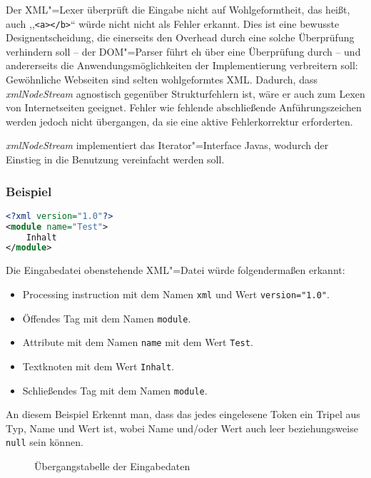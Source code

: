 \documentclass[10pt,a4paper,ngerman,titlepage,tocindentauto]{scrartcl}
\begin{document}
			Der XML"=Lexer überprüft die Eingabe nicht auf Wohlgeformtheit, das heißt, auch
			,,\verb|<a></b>|`` würde nicht nicht als Fehler erkannt. Dies ist eine bewusste Designentscheidung,
			die einerseits den Overhead durch eine solche Überprüfung verhindern soll -- der DOM"=Parser
			führt eh über eine Überprüfung durch -- und andererseits die Anwendungsmöglichkeiten der Implementierung
			verbreitern soll: Gewöhnliche Webseiten sind selten wohlgeformtes XML. Dadurch,
			dass {\em xmlNodeStream} agnostisch gegenüber Strukturfehlern ist, wäre er auch zum
			Lexen von Internetseiten geeignet. Fehler wie fehlende abschließende Anführungszeichen werden
			jedoch nicht übergangen, da sie eine aktive Fehlerkorrektur erforderten.
			
			{\em xmlNodeStream} implementiert das Iterator"=Interface Javas, wodurch der Einstieg in die
			Benutzung vereinfacht werden soll.
			
			\subsubsection*{Beispiel}
				\begin{lstlisting}[frame=single,language=XML,caption=Beispiel.xml]
<?xml version="1.0"?>
<module name="Test">
	Inhalt
</module>
				\end{lstlisting}
				Die Eingabedatei obenstehende XML"=Datei würde folgendermaßen erkannt:
				\begin{itemize}
					\item Processing instruction mit dem Namen \verb|xml| und Wert \verb|version="1.0"|.
					\item Öffendes Tag mit dem Namen \verb|module|.
					\item Attribute mit dem Namen \verb|name| mit dem Wert \verb|Test|.
					\item Textknoten mit dem Wert \verb|Inhalt|.
					\item Schließendes Tag mit dem Namen \verb|module|.
				\end{itemize}
				An diesem Beispiel Erkennt man, dass das jedes eingelesene Token ein Tripel aus
				Typ, Name und Wert ist, wobei Name und/oder Wert auch leer beziehungsweise \texttt{null} sein können.
			
			\begin{figure}[ht]
				\caption[Übergangstabelle der Eingabedaten]{\hypertarget{Uebergangsdiagramm_XML_Lexer}{Übergangstabelle der Eingabedaten}}
			\end{figure}
			
\end{document}
